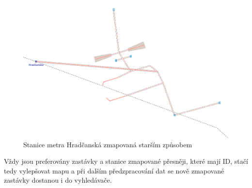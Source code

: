 \begin{figure}
  \centering
    \includegraphics[width=\textwidth]{../img/hradcanska.pdf}
  \caption{Stanice metra Hradčanská zmapovaná starším způsobem}
  \label{fig:metro-hrube}
\end{figure}

Vždy jsou preferovány zastávky a stanice zmapované přesněji, které mají ID,
stačí tedy vylepšovat mapu a při dalším předzpracování dat se nově zmapované
zastávky dostanou i do vyhledávače.

